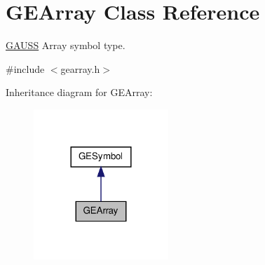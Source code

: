 \hypertarget{class_g_e_array}{\section{G\-E\-Array Class Reference}
\label{class_g_e_array}
}


\hyperlink{class_g_a_u_s_s}{G\-A\-U\-S\-S} Array symbol type.  




{\ttfamily \#include $<$gearray.\-h$>$}



Inheritance diagram for G\-E\-Array\-:
\nopagebreak
\begin{figure}[H]
\begin{center}
\leavevmode
\includegraphics[width=144pt]{class_g_e_array__inherit__graph}
\end{center}
\end{figure}
